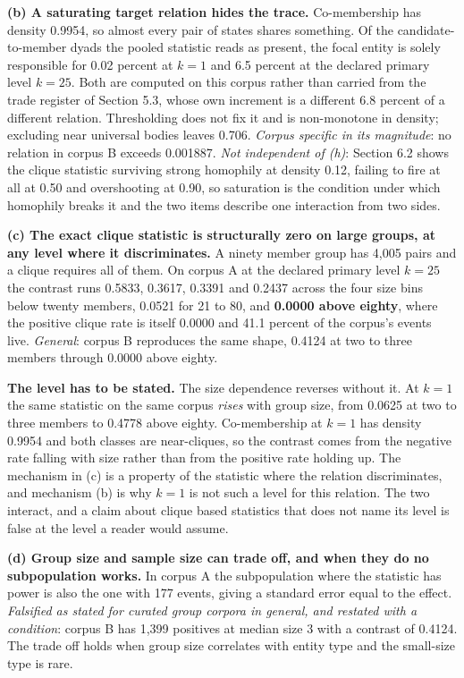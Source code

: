 \documentclass[twoside,11pt]{article}
\begin{document}
\textbf{(b) A saturating target relation hides the trace.} Co-membership has density 0.9954, so almost every pair of states shares something. Of the candidate-to-member dyads the pooled statistic reads as present, the focal entity is solely responsible for 0.02 percent at \(k = 1\) and 6.5 percent at the declared primary level \(k = 25\). Both are computed on this corpus rather than carried from the trade register of Section 5.3, whose own increment is a different 6.8 percent of a different relation. Thresholding does not fix it and is non-monotone in density; excluding near universal bodies leaves 0.706. \emph{Corpus specific in its magnitude}: no relation in corpus B exceeds 0.001887. \emph{Not independent of (h)}: Section 6.2 shows the clique statistic surviving strong homophily at density 0.12, failing to fire at all at 0.50 and overshooting at 0.90, so saturation is the condition under which homophily breaks it and the two items describe one interaction from two sides.

\textbf{(c) The exact clique statistic is structurally zero on large groups, at any level where it discriminates.} A ninety member group has 4,005 pairs and a clique requires all of them. On corpus A at the declared primary level \(k = 25\) the contrast runs 0.5833, 0.3617, 0.3391 and 0.2437 across the four size bins below twenty members, 0.0521 for 21 to 80, and \textbf{0.0000 above eighty}, where the positive clique rate is itself 0.0000 and 41.1 percent of the corpus's events live. \emph{General}: corpus B reproduces the same shape, 0.4124 at two to three members through 0.0000 above eighty.

\textbf{The level has to be stated.} The size dependence reverses without it. At \(k = 1\) the same statistic on the same corpus \emph{rises} with group size, from 0.0625 at two to three members to 0.4778 above eighty. Co-membership at \(k = 1\) has density 0.9954 and both classes are near-cliques, so the contrast comes from the negative rate falling with size rather than from the positive rate holding up. The mechanism in (c) is a property of the statistic where the relation discriminates, and mechanism (b) is why \(k = 1\) is not such a level for this relation. The two interact, and a claim about clique based statistics that does not name its level is false at the level a reader would assume.

\textbf{(d) Group size and sample size can trade off, and when they do no subpopulation works.} In corpus A the subpopulation where the statistic has power is also the one with 177 events, giving a standard error equal to the effect. \emph{Falsified as stated for curated group corpora in general, and restated with a condition}: corpus B has 1,399 positives at median size 3 with a contrast of 0.4124. The trade off holds when group size correlates with entity type and the small-size type is rare.
\end{document}
